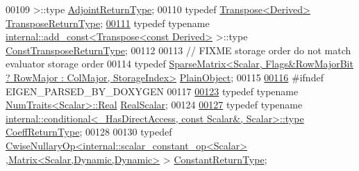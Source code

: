 \begin{DoxyCode}
00109                      >::type \hyperlink{class_eigen_1_1internal_1_1_tensor_lazy_evaluator_writable}{AdjointReturnType};
00110     \textcolor{keyword}{typedef} \hyperlink{group___core___module_class_eigen_1_1_transpose}{Transpose<Derived>} \hyperlink{group___core___module_class_eigen_1_1_transpose}{TransposeReturnType};
\hyperlink{group___sparse_core___module_a34225d20887df166fd66c9323fcef379}{00111}     \textcolor{keyword}{typedef} \textcolor{keyword}{typename} \hyperlink{struct_eigen_1_1internal_1_1add__const}{internal::add\_const<Transpose<const Derived>}
       >::type \hyperlink{group___core___module_class_eigen_1_1_transpose}{ConstTransposeReturnType};
00112 
00113     \textcolor{comment}{// FIXME storage order do not match evaluator storage order}
00114     \textcolor{keyword}{typedef} 
      \hyperlink{group___sparse_core___module_class_eigen_1_1_sparse_matrix}{SparseMatrix<Scalar, Flags&RowMajorBit ? RowMajor : ColMajor, StorageIndex>}
       \hyperlink{group___sparse_core___module_class_eigen_1_1_sparse_matrix}{PlainObject};
00115 
\hyperlink{group___sparse_core___module_aa9a80f82024c49bf896a8e9422d96a3b}{00116} \textcolor{preprocessor}{#ifndef EIGEN\_PARSED\_BY\_DOXYGEN}
00117 
\hyperlink{group___sparse_core___module_aaec8ace6efb785c81d442931c3248d88}{00123}     \textcolor{keyword}{typedef} \textcolor{keyword}{typename} \hyperlink{group___core___module_struct_eigen_1_1_num_traits}{NumTraits<Scalar>::Real} \hyperlink{group___sparse_core___module_aaec8ace6efb785c81d442931c3248d88}{RealScalar};
00124 
\hyperlink{group___sparse_core___module_a6d22c5b0afbf01233fea14e6481d2377}{00127}     \textcolor{keyword}{typedef} \textcolor{keyword}{typename} 
      \hyperlink{class_eigen_1_1internal_1_1_tensor_lazy_evaluator_writable}{internal::conditional<\_HasDirectAccess, const Scalar&, Scalar>::type}
       \hyperlink{class_eigen_1_1internal_1_1_tensor_lazy_evaluator_writable}{CoeffReturnType};
00128 
00130     \textcolor{keyword}{typedef} \hyperlink{group___core___module_class_eigen_1_1_cwise_nullary_op}{CwiseNullaryOp<internal::scalar\_constant\_op<Scalar>}
      ,\hyperlink{group___core___module}{Matrix<Scalar,Dynamic,Dynamic>} > 
      \hyperlink{group___core___module_class_eigen_1_1_cwise_nullary_op}{ConstantReturnType};

\end{DoxyCode}
